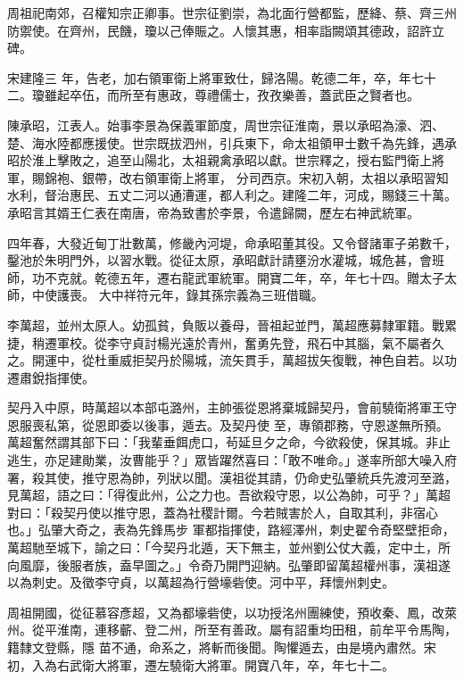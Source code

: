 \begin{pinyinscope}
 周祖祀南郊，召權知宗正卿事。世宗征劉崇，為北面行營都監，歷絳、蔡、齊三州防禦使。在齊州，民饑，瓊以己俸賑之。人懷其惠，相率詣闕頌其德政，詔許立碑。



 宋建隆三
 年，告老，加右領軍衛上將軍致仕，歸洛陽。乾德二年，卒，年七十二。瓊雖起卒伍，而所至有惠政，尊禮儒士，孜孜樂善，蓋武臣之賢者也。



 陳承昭，江表人。始事李景為保義軍節度，周世宗征淮南，景以承昭為濠、泗、楚、海水陸都應援使。世宗既拔泗州，引兵東下，命太祖領甲士數千為先鋒，遇承昭於淮上擊敗之，追至山陽北，太祖親禽承昭以獻。世宗釋之，授右監門衛上將軍，賜錦袍、銀帶，改右領軍衛上將軍，
 分司西京。宋初入朝，太祖以承昭習知水利，督治惠民、五丈二河以通漕運，都人利之。建隆二年，河成，賜錢三十萬。承昭言其婿王仁表在南唐，帝為致書於李景，令遣歸闕，歷左右神武統軍。



 四年春，大發近甸丁壯數萬，修畿內河堤，命承昭董其役。又令督諸軍子弟數千，鑿池於朱明門外，以習水戰。從征太原，承昭獻計請壅汾水灌城，城危甚，會班師，功不克就。乾德五年，遷右龍武軍統軍。開寶二年，卒，年七十四。贈太子太師，中使護喪。
 大中祥符元年，錄其孫宗義為三班借職。



 李萬超，並州太原人。幼孤貧，負販以養母，晉祖起並門，萬超應募隸軍籍。戰累捷，稍遷軍校。從李守貞討楊光遠於青州，奮勇先登，飛石中其腦，氣不屬者久之。開運中，從杜重威拒契丹於陽城，流矢貫手，萬超拔矢復戰，神色自若。以功遷肅銳指揮使。



 契丹入中原，時萬超以本部屯潞州，主帥張從恩將棄城歸契丹，會前驍衛將軍王守恩服喪私第，從恩即委以後事，遁去。及契丹使
 至，專領郡務，守恩遂無所預。萬超奮然謂其部下曰：「我輩垂餌虎口，茍延旦夕之命，今欲殺使，保其城。非止逃生，亦足建勛業，汝曹能乎？」眾皆躍然喜曰：「敢不唯命。」遂率所部大噪入府署，殺其使，推守恩為帥，列狀以聞。漢祖從其請，仍命史弘肇統兵先渡河至潞，見萬超，語之曰：「得復此州，公之力也。吾欲殺守恩，以公為帥，可乎？」萬超對曰：「殺契丹使以推守恩，蓋為社稷計爾。今若賊害於人，自取其利，非宿心也。」弘肇大奇之，表為先鋒馬步
 軍都指揮使，路經澤州，刺史翟令奇堅壁拒命，萬超馳至城下，諭之曰：「今契丹北遁，天下無主，並州劉公仗大義，定中土，所向風靡，後服者族，盍早圖之。」令奇乃開門迎納。弘肇即留萬超權州事，漢祖遂以為刺史。及徵李守貞，以萬超為行營壕砦使。河中平，拜懷州刺史。



 周祖開國，從征慕容彥超，又為都壕砦使，以功授洺州團練使，預收秦、鳳，改萊州。從平淮南，連移蘄、登二州，所至有善政。屬有詔重均田租，前牟平令馬陶，籍隸文登縣，隱
 苗不通，命系之，將斬而後聞。陶懼遁去，由是境內肅然。宋初，入為右武衛大將軍，遷左驍衛大將軍。開寶八年，卒，年七十二。




\end{pinyinscope}
